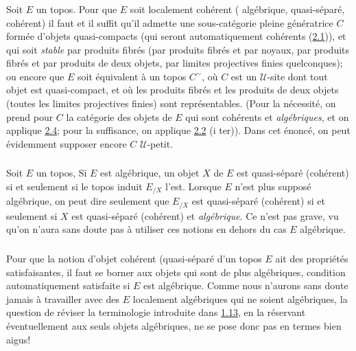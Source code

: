 \subsubsection{}
Soit $E$ un topos. Pour que $E$ soit localement cohérent (\resp
algébrique, \resp quasi-séparé, \resp cohérent) il faut et il suffit
qu'il admette une sous-catégorie pleine génératrice $C$ formée
d'objets quasi-compacts (qui seront automatiquement cohérents
(\hyperref[VI.prop2.1]{2.1})), et qui soit \emph{stable} par produits fibrés
(\resp par produits fibrés et par noyaux, \resp par produits fibrés
et par produits de deux objets, \resp par limites projectives finies
quelconques); ou encore que $E$ soit équivalent à un topos
$C^{\sim}$, où $C$ est un $𝒰$-site dont tout objet est
quasi-compact, et où les produits fibrés et les produits de deux
objets (\resp toutes les limites projectives finies) sont
représentables. (Pour la nécessité, on prend \pageoriginale pour $C$
la catégorie des objets de $E$ qui sont cohérents et
\emph{algébriques}, et on applique \hyperref[VI.subsec2.4]{2.4}; pour la
suffisance, on applique \hyperref[VI.prop2.2]{2.2} (i ter)). Dans cet énoncé,
on peut évidemment supposer encore $C$ $𝒰$-petit.

\subsubsection{}
Soit $E$ un topos, Si $E$ est algébrique, un objet $X$ de $E$ est
quasi-séparé (\resp cohérent) si et seulement si le topos induit
$E_{/X}$ l'est. Lorsque $E$ n'est plus supposé algébrique, on peut
dire seulement que $E_{/X}$ est quasi-séparé (\resp cohérent) si et
seulement si $X$ est quasi-séparé (\resp cohérent) et
\emph{algébrique}. Ce n'est pas grave, vu qu'on n'aura sans doute pas
à utiliser ces notions en dehors du cas $E$ algébrique.

\subsubsection{}
Pour que la notion d'objet cohérent (\resp quasi-séparé d'un
topos $E$ ait des propriétés satisfaisantes, il faut se borner aux
objets qui sont de plus algébriques, condition automatiquement
satisfaite si $E$ est algébrique. Comme nous n'aurons sans doute
jamais à travailler avec des $E$ localement algébriques qui ne soient
algébriques, la question de réviser la terminologie introduite dans
\hyperref[VI.def1.13]{1.13}, en la réservant éventuellement aux seuls objets algébriques, ne
se pose donc pas en termes bien aigus!

